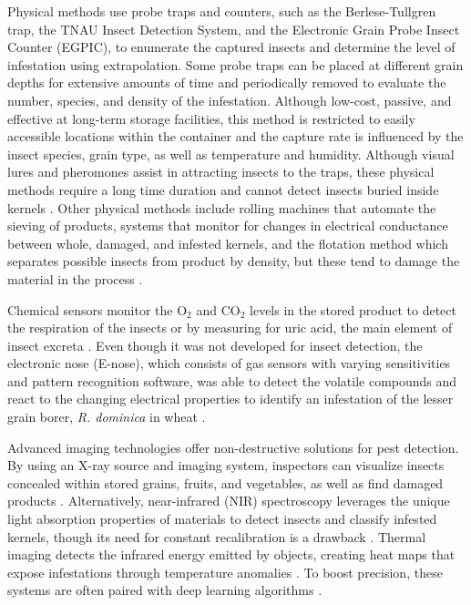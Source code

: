 Physical methods use probe traps and counters, such as the Berlese-Tullgren trap, the TNAU Insect Detection System, and the Electronic Grain Probe Insect Counter (EGPIC), to enumerate the captured insects and determine the level of infestation using extrapolation. Some probe traps can be placed at different grain depths for extensive amounts of time and periodically removed to evaluate the number, species, and density of the infestation. Although low-cost, passive, and effective at long-term storage facilities, this method is restricted to easily accessible locations within the container and the capture rate is influenced by the insect species, grain type, as well as temperature and humidity. Although visual lures and pheromones assist in attracting insects to the traps, these physical methods require a long time duration and cannot detect insects buried inside kernels \cite{neethirajanDetectionTechniquesStoredProduct2007, hoffmanStoredProductPestMonitoring2005}. Other physical methods include rolling machines that automate the sieving of products, systems that monitor for changes in electrical conductance between whole, damaged, and infested kernels, and the flotation method which separates possible insects from product by density, but these tend to damage the material in the process \cite{bonjourEvaluatingRemoteMonitoring2004, t.pearsonDetectionWheatKernels2007, thindDeterminationLowLevels2000}.

Chemical sensors monitor the $\text{O}_2$ and $\text{CO}_2$ levels in the stored product to detect the respiration of the insects or by measuring for uric acid, the main element of insect excreta \cite{rajeshEfficacyTnauStackProbe2015, srivastavaFuzzyControllerBased2019, srivastavaProbabilisticArtificialNeural2019}. Even though it was not developed for insect detection, the electronic nose (E-nose), which consists of gas sensors with varying sensitivities and pattern recognition software, was able to detect the volatile compounds and react to the changing electrical properties to identify an infestation of the lesser grain borer, \textit{R. dominica} in wheat \cite{srivastavaFuzzyControllerBased2019,srivastavaProbabilisticArtificialNeural2019}.

Advanced imaging technologies offer non-destructive solutions for pest detection. By using an X-ray source and imaging system, inspectors can visualize insects concealed within stored grains, fruits, and vegetables, as well as find damaged products \cite{XRayInspectionSystems2023, XRayDetectionFood2023}. Alternatively, near-infrared (NIR) spectroscopy leverages the unique light absorption properties of materials to detect insects and classify infested kernels, though its need for constant recalibration is a drawback \cite{neethirajanDetectionTechniquesStoredProduct2007, elizabethb.maghirangDetectingSingleWheat2002, keszthelyiNonDestructiveImagingSpectroscopic2020}. Thermal imaging detects the infrared energy emitted by objects, creating heat maps that expose infestations through temperature anomalies \cite{bangaTechniquesInsectDetection2018}. To boost precision, these systems are often paired with deep learning algorithms \cite{devipriyar.InsectPestDetection2022}.


